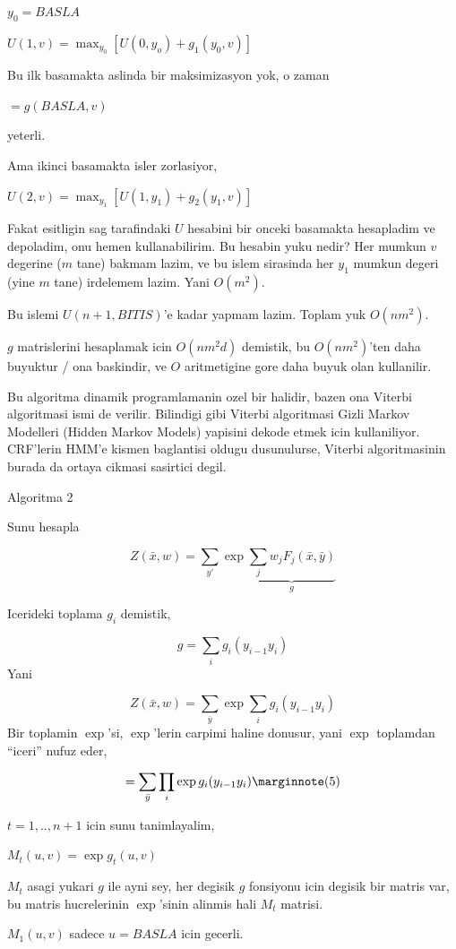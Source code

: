 \documentclass[12pt,fleqn]{article}\usepackage{../common}
\begin{document}
$y_0 = BASLA$

$U(1,v) = \max_{y_0} [ U(0,y_o) + g_1(y_0,v)]$

Bu ilk basamakta aslinda bir maksimizasyon yok, o zaman 

$ = g(BASLA,v)$

yeterli. 

Ama ikinci basamakta isler zorlasiyor, 

$U(2,v) = \max_{y_1} [ U(1,y_1) + g_2(y_1,v) ]$

Fakat esitligin sag tarafindaki $U$ hesabini bir onceki basamakta
hesapladim ve depoladim, onu hemen kullanabilirim. Bu hesabin yuku nedir? 
Her mumkun $v$ degerine ($m$ tane) bakmam lazim, ve bu islem sirasinda her
$y_1$ mumkun degeri (yine $m$ tane) irdelemem lazim. Yani $O(m^2)$. 

Bu islemi $U(n+1, BITIS)$'e kadar yapmam lazim. Toplam yuk $O(nm^2)$. 

$g$ matrislerini hesaplamak icin $O(nm^2d)$ demistik, bu  $O(nm^2)$'ten
daha buyuktur / ona baskindir, ve $O$ aritmetigine gore daha buyuk olan 
kullanilir. 

Bu algoritma dinamik programlamanin ozel bir halidir, bazen ona Viterbi
algoritmasi ismi de verilir. Bilindigi gibi Viterbi algoritmasi Gizli
Markov Modelleri (Hidden Markov Models) yapisini dekode etmek icin
kullaniliyor. CRF'lerin HMM'e kismen baglantisi oldugu dusunulurse, Viterbi
algoritmasinin burada da ortaya cikmasi sasirtici degil. 

Algoritma 2

Sunu hesapla

$$Z(\bar{x},w) = \sum_{y'} \exp 
\underbrace{\sum_j w_j F_j(\bar{x},\bar{y})}_{g}
$$

Icerideki toplama $g_i$ demistik, 

$$ g = \sum_i g_i(y_{i-1}y_i) $$
Yani


$$Z(\bar{x},w) = 
\sum_{\bar{y}} \exp 
\sum_i g_i(y_{i-1}y_i) 
$$
Bir toplamin $\exp$'si, $\exp$'lerin carpimi haline donusur, yani $\exp$
toplamdan ``iceri'' nufuz eder, 

$$
 = \sum_{\bar{y}} \prod_i \exp  g_i(y_{i-1}y_i) 
\mlabel{5}
$$

$t=1,..,n+1$ icin sunu tanimlayalim,

$M_t(u,v) = \exp g_t(u,v)$

$M_t$ asagi yukari $g$ ile ayni sey, her degisik $g$ fonsiyonu icin degisik
bir matris var, bu matris hucrelerinin $\exp$'sinin alinmis hali $M_t$ matrisi.

$M_1(u,v)$ sadece $u=BASLA$ icin gecerli. 
\end{document}
